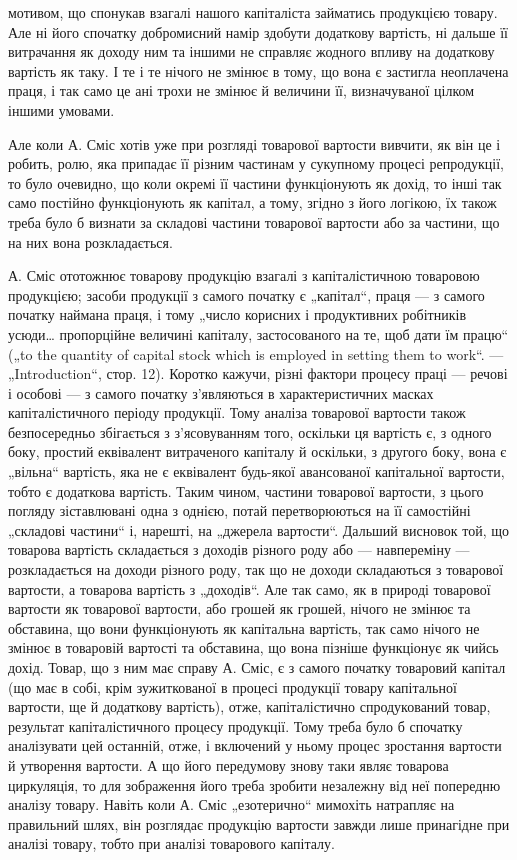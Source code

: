 \parcont{}  %
мотивом, що спонукав взагалі нашого капіталіста займатись продукцією
товару. Але ні його спочатку добромисний намір здобути додаткову
вартість, ні дальше її витрачання як доходу ним та іншими не справляє
жодного впливу на додаткову вартість як таку. І те і те нічого не змінює
в тому, що вона є застигла неоплачена праця, і так само це ані
трохи не змінює й величини її, визначуваної цілком іншими умовами.

Але коли А. Сміс хотів уже при розгляді товарової вартости вивчити,
як він це і робить, ролю, яка припадає її різним частинам у сукупному
процесі репродукції, то було очевидно, що коли окремі її частини
функціонують як дохід, то інші так само постійно функціонують як капітал,
а тому, згідно з його логікою, їх також треба було б визнати за
складові частини товарової вартости або за частини, що на них вона
розкладається.

А. Сміс ототожнює товарову продукцію взагалі з капіталістичною
товаровою продукцією; засоби продукції з самого початку є „капітал“,
праця — з самого початку наймана праця, і тому „число корисних і продуктивних
робітників усюди\dots{} пропорційне величині капіталу, застосованого
на те, щоб дати їм працю“ („to the quantity of capital stock which
is employed in setting them to work“. — „Introduction“, стор. 12). Коротко
кажучи, різні фактори процесу праці — речові і особові — з самого початку
з’являються в характеристичних масках капіталістичного періоду
продукції. Тому аналіза товарової вартости також безпосередньо збігається
з з’ясовуванням того, оскільки ця вартість є, з одного боку, простий
еквівалент витраченого капіталу й оскільки, з другого боку, вона є
„вільна“ вартість, яка не є еквівалент будь-якої авансованої капітальної
вартости, тобто є додаткова вартість. Таким чином, частини товарової
вартости, з цього погляду зіставлювані одна з однією, потай перетворюються
на її самостійні „складові частини“ і, нарешті, на „джерела вартости“.
Дальший висновок той, що товарова вартість складається з доходів
різного роду або — навпереміну — розкладається на доходи різного
роду, так що не доходи складаються з товарової вартости, а товарова
вартість з „доходів“. Але так само, як в природі товарової вартости як
товарової вартости, або грошей як грошей, нічого не змінює та обставина,
що вони функціонують як капітальна вартість, так само нічого не
змінює в товаровій вартості та обставина, що вона пізніше функціонує
як чийсь дохід. Товар, що з ним має справу А. Сміс, є з самого початку
товаровий капітал (що має в собі, крім зужиткованої в процесі продукції
товару капітальної вартости, ще й додаткову вартість), отже, капіталістично
спродукований товар, результат капіталістичного процесу
продукції. Тому треба було б спочатку аналізувати цей останній, отже,
і включений у ньому процес зростання вартости й утворення вартости.
А що його передумову знову таки являє товарова циркуляція, то для
зображення його треба зробити незалежну від неї попередню аналізу
товару. Навіть коли А. Сміс „езотерично“ мимохіть натрапляє на правильний
шлях, він розглядає продукцію вартости завжди лише принагідне
при аналізі товару, тобто при аналізі товарового капіталу.
